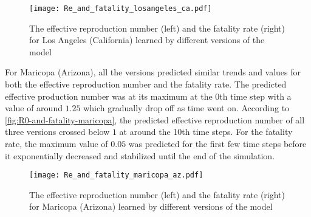 \begin{figure}[!htb]
    \centering
    \texttt{[image: Re\_and\_fatality\_losangeles\_ca.pdf]}
    \caption{The effective reproduction number (left) and the fatality rate (right) for Los Angeles (California) learned by different versions of the model}
    \label{fig:R0-and-fatality-losangeles}
\end{figure}

For Maricopa (Arizona), all the versions predicted similar trends and values for both the effective reproduction number and the fatality rate.
The predicted effective production number was at its maximum at the 0th time step with a value of around $1.25$ which gradually drop off as time went on.
According to \autoref{fig:R0-and-fatality-maricopa}, the predicted effective reproduction number of all three versions crossed below $1$ at around the 10th time steps.
For the fatality rate, the maximum value of $0.05$ was predicted for the first few time steps before it exponentially decreased and stabilized until the end of the simulation.

\begin{figure}[!htb]
    \centering
    \texttt{[image: Re\_and\_fatality\_maricopa\_az.pdf]}
    \caption{The effective reproduction number (left) and the fatality rate (right) for Maricopa (Arizona) learned by different versions of the model}
    \label{fig:R0-and-fatality-maricopa}
\end{figure}
